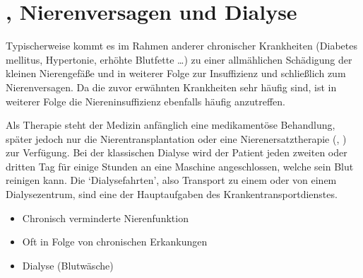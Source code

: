 


\section{, Nierenversagen und Dialyse}


\TextSlide
{{\TxBeschreibung}}%
{%
\label{topic:niereninsuffizienz}%
\label{topic:cni-therapie-dialyse}%


Typischerweise kommt es im Rahmen anderer chronischer Krankheiten (Diabetes
mellitus, Hypertonie, erhöhte Blutfette \ldots) zu einer allmählichen
Schädigung der kleinen Nierengefäße und in weiterer
Folge zur Insuffizienz und schließlich zum Nierenversagen. Da die zuvor erwähnten Krankheiten
sehr häufig sind, ist in weiterer Folge die
Niereninsuffizienz ebenfalls häufig anzutreffen.

Als Therapie steht der Medizin anfänglich eine medikamentöse
Behandlung, 
später jedoch nur die Nierentransplantation 
oder eine Nierenersatztherapie 
(, ) zur
Verfügung. Bei der klassischen Dialyse wird der Patient jeden
zweiten oder dritten Tag für einige Stunden an eine Maschine
angeschlossen, welche sein Blut reinigen kann. Die
\enquote*{Dialysefahrten}, also Transport zu einem oder von
einem Dialysezentrum, sind eine der Hauptaufgaben des
Krankentransportdienstes. 
}%
{%
	\begin{itemize}
		\item Chronisch verminderte Nierenfunktion
		\item Oft in Folge von chronischen Erkankungen
		\item Dialyse (Blutwäsche)
	\end{itemize}
}%

